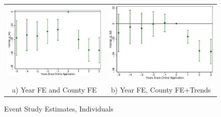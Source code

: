 \documentclass[11pt,letterpaper]{article}
\begin{document}
\begin{figure}\caption{Event Study Estimates, Individuals}
\begin{tabular}{cc}
\includegraphics[scale=0.57]{tabfig/evstu_snap_p_tot_one_yrcf_5_3}&\includegraphics[scale=0.57]{tabfig/evstu_snap_p_tot_one_yrcfsttr_5_3}\\
a) Year FE and County FE&b) Year FE, County FE+Trends\\

\end{tabular}
\end{figure}
\end{document}
